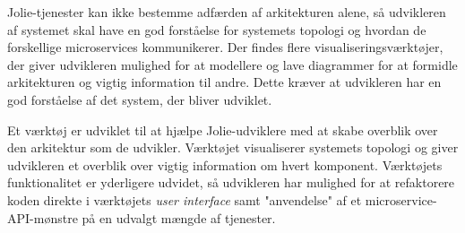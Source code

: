 Jolie-tjenester kan ikke bestemme adfærden af arkitekturen alene, så udvikleren af systemet skal have en god forståelse for systemets topologi og hvordan de forskellige microservices kommunikerer.
Der findes flere visualiseringsværktøjer, der giver udvikleren mulighed for at modellere og lave diagrammer for at formidle arkitekturen og vigtig information til andre.
Dette kræver at udvikleren har en god forståelse af det system, der bliver udviklet.

Et værktøj er udviklet til at hjælpe Jolie-udviklere med at skabe overblik over den arkitektur som de udvikler.
Værktøjet visualiserer systemets topologi og giver udvikleren et overblik over vigtig information om hvert komponent.
Værktøjets funktionalitet er yderligere udvidet, så udvikleren har mulighed for at refaktorere koden direkte i værktøjets \emph{user interface} samt "anvendelse" af et microservice-API-mønstre på en udvalgt mængde af tjenester.